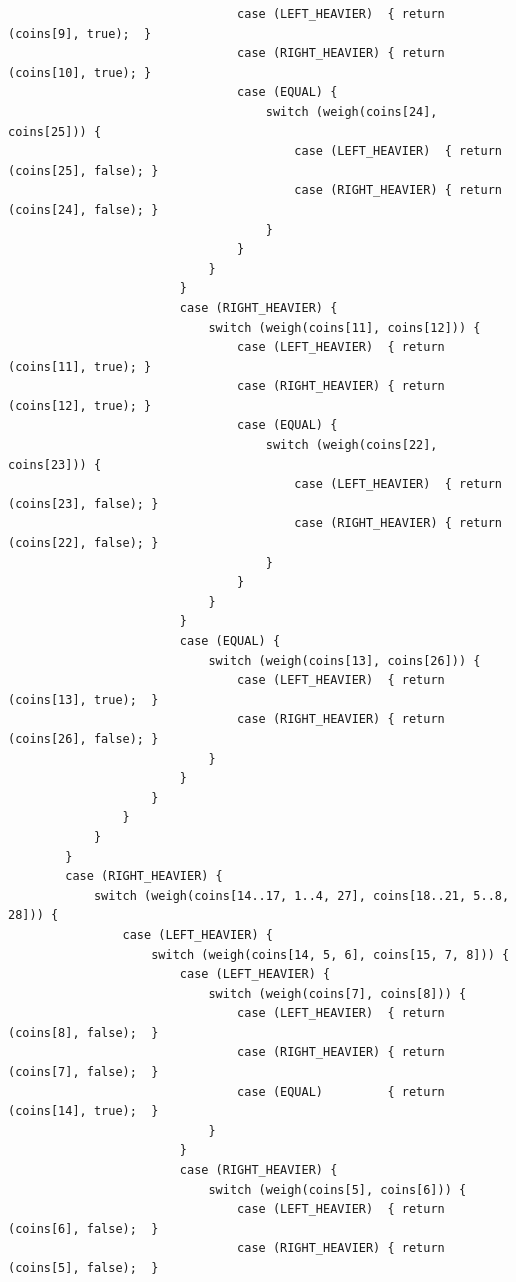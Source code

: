 \documentclass[answers]{exam}
\begin{document}
\begin{questions}
\begin{parts}
\begin{solution}
\begin{small}
\begin{verbatim}
                                case (LEFT_HEAVIER)  { return (coins[9], true);  }
                                case (RIGHT_HEAVIER) { return (coins[10], true); }
                                case (EQUAL) {
                                    switch (weigh(coins[24], coins[25])) {
                                        case (LEFT_HEAVIER)  { return (coins[25], false); }
                                        case (RIGHT_HEAVIER) { return (coins[24], false); }
                                    }
                                }
                            }
                        }
                        case (RIGHT_HEAVIER) {
                            switch (weigh(coins[11], coins[12])) {
                                case (LEFT_HEAVIER)  { return (coins[11], true); }
                                case (RIGHT_HEAVIER) { return (coins[12], true); }
                                case (EQUAL) {
                                    switch (weigh(coins[22], coins[23])) {
                                        case (LEFT_HEAVIER)  { return (coins[23], false); }
                                        case (RIGHT_HEAVIER) { return (coins[22], false); }
                                    }
                                }
                            }
                        }
                        case (EQUAL) {
                            switch (weigh(coins[13], coins[26])) {
                                case (LEFT_HEAVIER)  { return (coins[13], true);  }
                                case (RIGHT_HEAVIER) { return (coins[26], false); }
                            }
                        }
                    }
                }
            }
        }
        case (RIGHT_HEAVIER) {
            switch (weigh(coins[14..17, 1..4, 27], coins[18..21, 5..8, 28])) {
                case (LEFT_HEAVIER) {
                    switch (weigh(coins[14, 5, 6], coins[15, 7, 8])) {
                        case (LEFT_HEAVIER) {
                            switch (weigh(coins[7], coins[8])) {
                                case (LEFT_HEAVIER)  { return (coins[8], false);  }
                                case (RIGHT_HEAVIER) { return (coins[7], false);  }
                                case (EQUAL)         { return (coins[14], true);  }
                            }
                        }
                        case (RIGHT_HEAVIER) {
                            switch (weigh(coins[5], coins[6])) {
                                case (LEFT_HEAVIER)  { return (coins[6], false);  }
                                case (RIGHT_HEAVIER) { return (coins[5], false);  }

\end{verbatim}
\end{small}
\end{solution}
\end{parts}
\end{questions}
\end{document}
